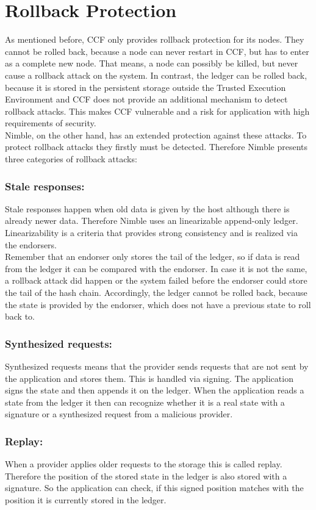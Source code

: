 \section{Rollback Protection}
As mentioned before, CCF only provides rollback protection for its nodes. They cannot be rolled back, because a node can never restart in CCF, but has to enter as a complete new node. That means, a node can possibly be killed, but never cause a rollback attack on the system. In contrast, the ledger can be rolled back, because it is stored in the persistent storage outside the Trusted Execution Environment and CCF does not provide an additional mechanism to detect rollback attacks. This makes CCF vulnerable and a risk for application with high requirements of security.\\
 Nimble, on the other hand, has an extended protection against these attacks. To protect rollback attacks they firstly must be detected. Therefore Nimble presents three categories of rollback attacks:
	\subsubsection*{Stale responses:} Stale responses happen when old data is given by the host although there is already newer data. Therefore Nimble uses an linearizable append-only ledger. Linearizability is a criteria that provides strong consistency and is realized via the endorsers.\\
	 Remember that an endorser only stores the tail of the ledger, so if data is read from the ledger it can be compared with the endorser. In case it is not the same, a rollback attack did happen or the system failed before the endorser could store the tail of the hash chain. Accordingly, the ledger cannot be rolled back, because the state is provided by the endorser, which does not have a previous state to roll back to. 
	\subsubsection*{Synthesized requests:} Synthesized requests means that the provider sends requests that are not sent by the application and stores them. This is handled via signing. The application signs the state and then appends it on the ledger. When the application reads a state from the ledger it then can recognize whether it is a real state with a signature or a synthesized request from a malicious provider.
	\subsubsection*{Replay:} When a provider applies older requests to the storage this is called replay. Therefore the position of the stored state in the ledger is also stored with a signature. So the application can check, if this signed position matches with the position it is currently stored in the ledger.\\
	
